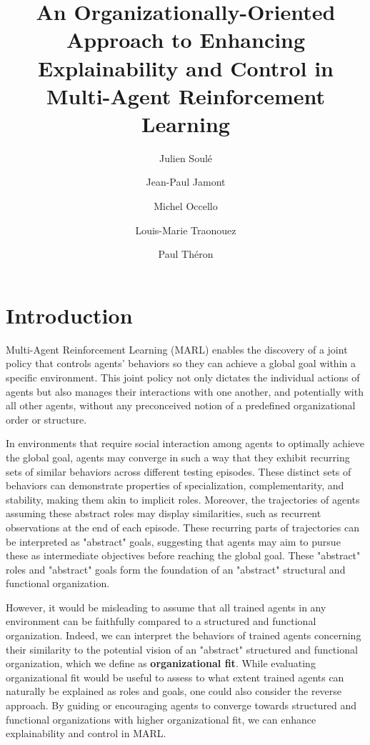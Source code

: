 \documentclass[sigconf,anonymous]{aamas}
\title[AAMAS-2025 CybMASDE]{An Organizationally-Oriented Approach to Enhancing Explainability and Control in Multi-Agent Reinforcement Learning}
\author{Julien Soulé}
\affiliation{
  \institution{Univ. Grenoble Alpes}
  \city{Valence}
  \country{France}}
\author{Jean-Paul Jamont}
\affiliation{
  \institution{Univ. Grenoble Alpes}
  \city{Valence}
  \country{France}}
\author{Michel Occello}
\affiliation{
  \institution{Univ. Grenoble Alpes}
  \city{Valence}
  \country{France}}
\author{Louis-Marie Traonouez}
\affiliation{
  \institution{Thales Land and Air Systems, BU IAS}
  \city{Rennes}
  \country{France}}
\author{Paul Théron}
\affiliation{
  \institution{AICA IWG}
  \city{La Guillermie}
  \country{France}}
\begin{document}

\pagestyle{fancy}
\fancyhead{}


\maketitle


\section{Introduction}

Multi-Agent Reinforcement Learning (MARL) enables the discovery of a joint policy that controls agents' behaviors so they can achieve a global goal within a specific environment. 
This joint policy not only dictates the individual actions of agents but also manages their interactions with one another, and potentially with all other agents, without any preconceived notion of a predefined organizational order or structure. 

In environments that require social interaction among agents to optimally achieve the global goal, agents may converge in such a way that they exhibit recurring sets of similar behaviors across different testing episodes. 
These distinct sets of behaviors can demonstrate properties of specialization, complementarity, and stability, making them akin to implicit roles. Moreover, the trajectories of agents assuming these abstract roles may display similarities, such as recurrent observations at the end of each episode. These recurring parts of trajectories can be interpreted as "abstract" goals, suggesting that agents may aim to pursue these as intermediate objectives before reaching the global goal. These "abstract" roles and "abstract" goals form the foundation of an "abstract" structural and functional organization.

However, it would be misleading to assume that all trained agents in any environment can be faithfully compared to a structured and functional organization. Indeed, we can interpret the behaviors of trained agents concerning their similarity to the potential vision of an "abstract" structured and functional organization, which we define as \textbf{organizational fit}.
While evaluating organizational fit would be useful to assess to what extent trained agents can naturally be explained as roles and goals, one could also consider the reverse approach. By guiding or encouraging agents to converge towards structured and functional organizations with higher organizational fit, we can enhance explainability and control in MARL.
\end{document}

